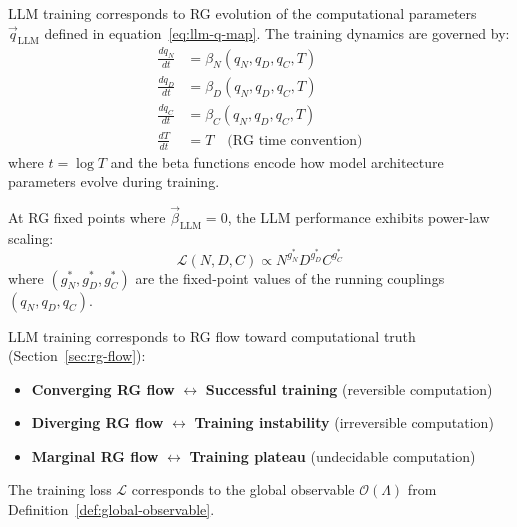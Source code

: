\begin{definition}
\label{def:llm-training-rg}
LLM training corresponds to RG evolution of the computational parameters $\vec{q}_{\text{LLM}}$ defined in equation~\eqref{eq:llm-q-map}. The training dynamics are governed by:
\begin{align}
\frac{dq_N}{dt} &= \beta_N(q_N, q_D, q_C, T) \label{eq:beta-N} \\
\frac{dq_D}{dt} &= \beta_D(q_N, q_D, q_C, T) \label{eq:beta-D} \\
\frac{dq_C}{dt} &= \beta_C(q_N, q_D, q_C, T) \label{eq:beta-C} \\
\frac{dT}{dt} &= T \quad \text{(RG time convention)} \label{eq:beta-T}
\end{align}
where $t = \log T$ and the beta functions encode how model architecture parameters evolve during training.
\end{definition}

\begin{theorem}
\label{thm:llm-scaling-laws}
At RG fixed points where $\vec{\beta}_{\text{LLM}} = 0$, the LLM performance exhibits power-law scaling:
\begin{equation}
\mathcal{L}(N, D, C) \propto N^{g_N^*} D^{g_D^*} C^{g_C^*} \label{eq:llm-scaling-law}
\end{equation}
where $(g_N^*, g_D^*, g_C^*)$ are the fixed-point values of the running couplings $(q_N, q_D, q_C)$.
\end{theorem}

\begin{proposition}
\label{prop:llm-truth-connection}
LLM training corresponds to RG flow toward computational truth (Section~\ref{sec:rg-flow}):
\begin{itemize}
\item \textbf{Converging RG flow} $\leftrightarrow$ \textbf{Successful training} (reversible computation)
\item \textbf{Diverging RG flow} $\leftrightarrow$ \textbf{Training instability} (irreversible computation)  
\item \textbf{Marginal RG flow} $\leftrightarrow$ \textbf{Training plateau} (undecidable computation)
\end{itemize}
The training loss $\mathcal{L}$ corresponds to the global observable $\mathcal{O}(\Lambda)$ from Definition~\ref{def:global-observable}.
\end{proposition}

